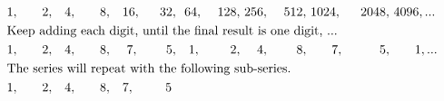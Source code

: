 \begin{alignat*}{15}
&1,&\quad2,&\quad4,&\quad8,&~~~16,&~~32,&~~64,&~128,&~256,&~512,&~1024,&~2048,&~4096, ...\\
\rlap{\text{Keep adding each digit, until the final result is one digit, ...}}\\
&1,&\quad2,&\quad4,&\quad8,&\quad~7,&\quad5,&\quad1,&\quad~2,&\quad~4,&\quad~8,&\quad~~~7,&\quad~~~5,&\quad~~~1, ...\\
\rlap{\text{The series will repeat with the following sub-series.}}\\
&1,&\quad2,&\quad4,&\quad8,&\quad7,&\quad5~
\end{alignat*}
